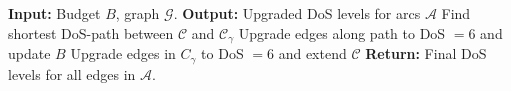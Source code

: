 \documentclass[letterpaper, 10 pt, conference]{ieeeconf}  %
\begin{document}
\begin{algorithm}[H]
\caption{MLCC Algorithm}
\label{pseudocode:MLCC}
\footnotesize
\begin{algorithmic}[1]
\State \textbf{Input:} Budget $B$, graph $\mathcal{G}$.
\State \textbf{Output:} Upgraded DoS levels for arcs $\mathcal{A}$
    \State Find shortest DoS-path between $\mathcal{C}$ and $\mathcal{C}_{\gamma}$
    \State Upgrade edges along path to DoS $=6$ and update $B$
    \State Upgrade edges in $C_{\gamma}$ to DoS $=6$ and extend $\mathcal{C}$
\EndWhile
\State \textbf{Return:} Final DoS levels for all edges in $\mathcal{A}$.
\end{algorithmic}
\end{algorithm}



\end{document}
